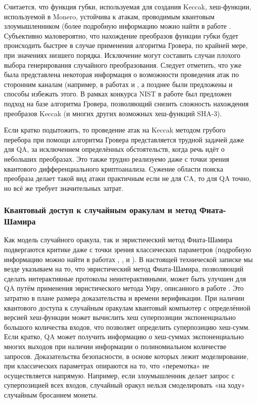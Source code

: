 \documentclass{mrl}
\begin{document}
Считается, что функция губки, используемая для создания Keccak, хеш-функции, используемой в Monero, устойчива к атакам, проводимым квантовым злоумышленником (более подробную информацию можно найти в работе \cite{czajkowski2017quantum}. Субъективно маловероятно, что нахождение преобразов функции губки будет происходить быстрее в случае применения алгоритма Гровера, по крайней мере, при значениях низшего порядка. Исключение могут составить случаи плохого выбора генерирования случайного преобразования. Следует отметить, что уже была представлена некоторая информация о возможности проведения атак по сторонним каналам (например, в работах \cite{kannwischer2020single} и \cite{graff2018differential}, а позднее были предложены и способы избежать этого. В рамках конкурса NIST в работе \cite{bernsteinquantum} был предложен подход на базе алгоритма Гровера, позволяющий снизить сложность нахождения преобразов Keccak (и многих других возможных хеш-функций SHA-$3$).

Если кратко подытожить, то проведение атак на Keccak методом грубого перебора при помощи алгоритма Гровера представляется трудной задачей даже для QA, за исключением определённых обстоятельств, когда речь идёт о небольших преобразах. Это также трудно реализуемо даже с точки зрения квантового дифференциального криптоанализа. Сужение области поиска преобраза делает такой вид атаки практичным если не для CA, то для QA точно, но всё же требует значительных затрат.

\subsubsection{Квантовый доступ к случайным оракулам и метод Фиата-Шамира}

Как модель случайного оракула, так и эвристический метод Фиата-Шамира подвергаются критике даже с точки зрения классических параметров (подробную информацию можно найти в работах \cite{canetti2004random}, \cite{goldwasser2003security}, \cite{unruh2015non} и \cite{unruh2017post}). В настоящей технической записке мы везде указываем на то, что эвристический метод Фиата-Шамира, позволяющий сделать интерактивные протоколы неинтерактивными, может быть улучшен для QA путём применения эвристического метода Унру, описанного в работе \cite{unruh2015non}. Это затратно в плане размера доказательства и времени верификации. При наличии квантового доступа к случайным оракулам квантовый компьютер с определённой версией хеш-функции может вычислить хеш суперпозиции экспоненциально большого количества входов, что позволяет определить суперпозицию хеш-сумм. Если кратко, QA может получить информацию о хеш-суммах экспоненциально многих выходов при наличии информации о полиномиальном количестве запросов. Доказательства безопасности, в основе которых лежит моделирование, при классических параметрах опираются на то, что «перемотка» не осуществляется напрямую. Например, если злоумышленник делает запрос с суперпозицией всех входов, случайный оракул нельзя смоделировать «на ходу» случайным бросанием монеты.
\end{document}
